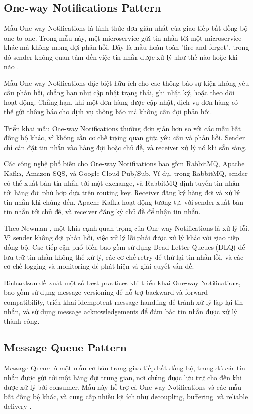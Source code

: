 \subsection{One-way Notifications Pattern}
Mẫu One-way Notifications là hình thức đơn giản nhất của giao tiếp bất đồng bộ one-to-one. Trong mẫu này, một microservice gửi tin nhắn tới một microservice khác mà không mong đợi phản hồi. Đây là mẫu hoàn toàn "fire-and-forget", trong đó sender không quan tâm đến việc tin nhắn được xử lý như thế nào hoặc khi nào \cite{hohpe2004}.

Mẫu One-way Notifications đặc biệt hữu ích cho các thông báo sự kiện không yêu cầu phản hồi, chẳng hạn như cập nhật trạng thái, ghi nhật ký, hoặc theo dõi hoạt động. Chẳng hạn, khi một đơn hàng được cập nhật, dịch vụ đơn hàng có thể gửi thông báo cho dịch vụ thông báo mà không cần đợi phản hồi.

Triển khai mẫu One-way Notifications thường đơn giản hơn so với các mẫu bất đồng bộ khác, vì không cần cơ chế tương quan giữa yêu cầu và phản hồi. Sender chỉ cần đặt tin nhắn vào hàng đợi hoặc chủ đề, và receiver xử lý nó khi sẵn sàng.

Các công nghệ phổ biến cho One-way Notifications bao gồm RabbitMQ, Apache Kafka, Amazon SQS, và Google Cloud Pub/Sub. Ví dụ, trong RabbitMQ, sender có thể xuất bản tin nhắn tới một exchange, và RabbitMQ định tuyến tin nhắn tới hàng đợi phù hợp dựa trên routing key. Receiver đăng ký hàng đợi và xử lý tin nhắn khi chúng đến. Apache Kafka hoạt động tương tự, với sender xuất bản tin nhắn tới chủ đề, và receiver đăng ký chủ đề để nhận tin nhắn.

Theo Newman \cite{newman2015}, một khía cạnh quan trọng của One-way Notifications là xử lý lỗi. Vì sender không đợi phản hồi, việc xử lý lỗi phải được xử lý khác với giao tiếp đồng bộ. Các tiếp cận phổ biến bao gồm sử dụng Dead Letter Queues (DLQ) để lưu trữ tin nhắn không thể xử lý, các cơ chế retry để thử lại tin nhắn lỗi, và các cơ chế logging và monitoring để phát hiện và giải quyết vấn đề.

Richardson \cite{richardson2019} đề xuất một số best practices khi triển khai One-way Notifications, bao gồm sử dụng message versioning để hỗ trợ backward và forward compatibility, triển khai idempotent message handling để tránh xử lý lặp lại tin nhắn, và sử dụng message acknowledgements để đảm bảo tin nhắn được xử lý thành công.

\subsection{Message Queue Pattern}
Message Queue là một mẫu cơ bản trong giao tiếp bất đồng bộ, trong đó các tin nhắn được gửi tới một hàng đợi trung gian, nơi chúng được lưu trữ cho đến khi được xử lý bởi consumer. Mẫu này hỗ trợ cả One-way Notifications và các mẫu bất đồng bộ khác, và cung cấp nhiều lợi ích như decoupling, buffering, và reliable delivery \cite{hohpe2004}.

